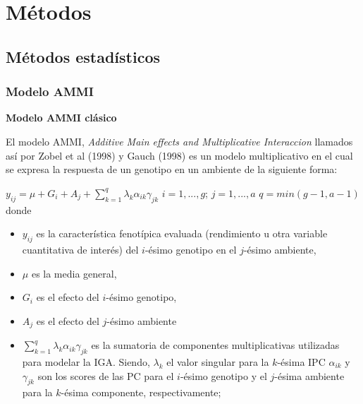 


\chapter{Métodos}
\section{Métodos estadísticos}

\subsection{Modelo AMMI}

\textbf{Modelo AMMI clásico}

El modelo AMMI, \emph{Additive Main effects and Multiplicative Interaccion} llamados así por Zobel et al (1998) y Gauch (1998) es un modelo multiplicativo en el cual se expresa la respuesta de un genotipo en un ambiente de la siguiente forma:

$y_{ij}= \mu +G_i + A_j + \sum_{k=1}^q \lambda_k \alpha_{ik} \gamma_{jk}$ \vspace{1cm} $ i=1,...,g$; $ j=1,...,a$ $q=min(g-1,a-1)$
donde 
\begin{itemize}
\item $y_{ij}$ es la característica fenotípica evaluada (rendimiento u otra variable cuantitativa de interés) del $i$-ésimo genotipo en el $j$-ésimo ambiente,
\item $\mu$ es la media general,
\item  $G_i$ es el efecto del $i$-ésimo genotipo,
\item $A_j$ es el efecto del $j$-ésimo ambiente
\item $\sum_{k=1}^q \lambda_k \alpha_{ik} \gamma_{jk}$ es la sumatoria de componentes multiplicativas utilizadas para modelar la IGA. Siendo, $\lambda_k$ el valor singular para la  $k$-ésima IPC $\alpha_{ik}$ y $\gamma_{jk}$ son los scores de las PC para el $i$-ésimo genotipo y el $j$-ésima ambiente para la $k$-ésima componente, respectivamente;
\end{itemize}


